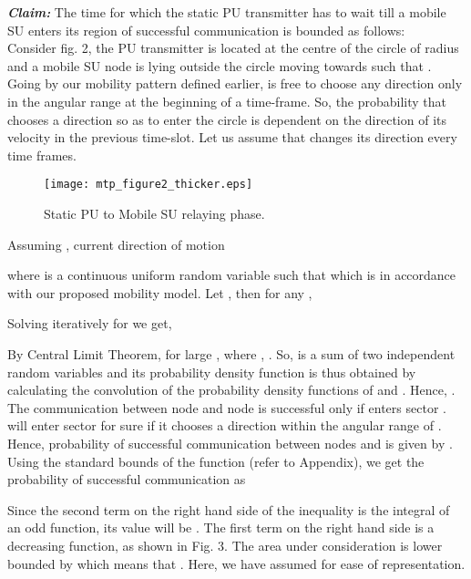 \documentclass[conference]{IEEEtran}
\begin{document}
\textit{\bf Claim:} The time for which the static PU transmitter has to wait till a mobile SU enters its region of successful communication is bounded as follows:\\

 Consider fig. 2, the PU transmitter  is located at the centre of the circle of radius and a mobile SU node  is lying outside the circle moving towards
 such that . Going 
by our mobility pattern defined earlier,  is free to choose any direction only in the angular range  at the beginning of a time-frame. So, the probability 
that  chooses a direction so as to enter the circle is dependent on the direction of its velocity in the previous time-slot. Let us assume that  changes its direction every 
time frames. 

\begin{figure}[ht] \centering \label{con} \texttt{[image: mtp\_figure2\_thicker.eps]}\\
\caption{Static PU to Mobile SU relaying phase.} 
\vspace{0.05in}
\end{figure}

Assuming , current direction of motion

where  is a continuous uniform random variable such that  which is in accordance with our proposed mobility model. Let , then for any ,

Solving iteratively for  we get,


By Central Limit Theorem, for large ,  where , . So,  is a sum of two independent random variables and its probability density function is thus obtained by 
calculating the convolution of the probability density functions of  and . Hence,  .
The communication between node  and node  is successful only if  enters sector .  will enter sector  for sure if it chooses a direction within the angular range of .
Hence, probability of successful communication between nodes  and  is given by . Using the standard bounds of the  function (refer to Appendix), we get the probability of successful communication as

Since the second term on the right hand side of the inequality is the integral of an odd function, its value will be . The first term on the right hand side is a decreasing 
function, as shown in Fig. 3. The area under consideration is lower bounded by  which means that . Here, we have assumed  for ease of representation.
\end{document}
